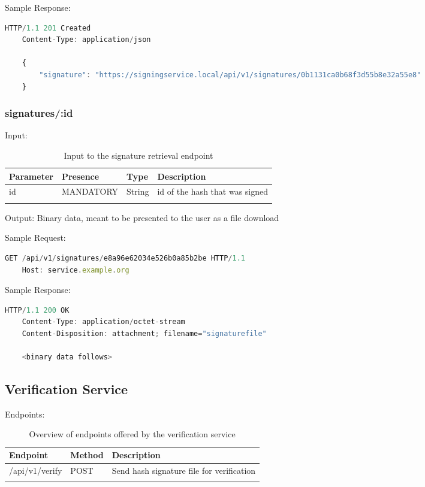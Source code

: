 Sample Response:

\begin{lstlisting}[caption={sign response}, captionpos=b, language=JavaScript, label={lst:signresponse}]
    HTTP/1.1 201 Created
    Content-Type: application/json

    {
        "signature": "https://signingservice.local/api/v1/signatures/0b1131ca0b68f3d55b8e32a55e8"
    }
\end{lstlisting}

\subsubsection{signatures/:id}
Input:

\begin{longtable}{|l|l|l|l|}
    \hline
    \textbf{Parameter} & \textbf{Presence} & \textbf{Type} & \textbf{Description} \\ \hline
    id & MANDATORY & String & id of the hash that was signed \\ \hline
    \caption{Input to the signature retrieval endpoint}
\end{longtable}

Output: Binary data, meant to be presented to the user as a file download


Sample Request:

\begin{lstlisting}[caption={signature request}, captionpos=b, language=JavaScript, label={lst:signaturerequest}]
    GET /api/v1/signatures/e8a96e62034e526b0a85b2be HTTP/1.1
    Host: service.example.org
\end{lstlisting}

Sample Response:

\begin{lstlisting}[caption={signature response}, captionpos=b, language=JavaScript, label={lst:signatureresponse}]
    HTTP/1.1 200 OK
    Content-Type: application/octet-stream
    Content-Disposition: attachment; filename="signaturefile"

    <binary data follows>
\end{lstlisting}

\subsection{Verification Service}
Endpoints:

\begin{longtable}{|l|l|l|}
    \hline
    \textbf{Endpoint} & \textbf{Method} & \textbf{Description} \\ \hline
    /api/v1/verify & POST & Send hash signature file for verification \\ \hline
    \caption{Overview of endpoints offered by the verification service}
\end{longtable}


